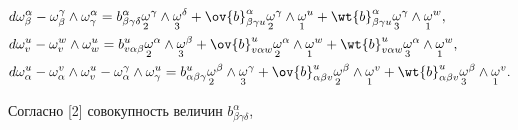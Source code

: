 \begin{align}


&d \omega^{\alpha}_{\beta} - \omega^{\gamma}_{\beta}\wedge


\omega^{\alpha}_{\gamma}=


b^{\alpha}_{\beta \gamma \delta}


{\crazy{\omega}{2}}^{\gamma}\wedge{\crazy{\omega}{3}}^{\delta}+


\ov{b}^{\alpha}_{\beta \gamma u}


{\crazy{\omega}{2}}^{\gamma}\wedge{\crazy{\omega}{1}}^{u}+


\wt{b}^{\alpha}_{\beta \gamma u}


{\crazy{\omega}{3}}^{\gamma}\wedge{\crazy{\omega}{1}}^{w},\notag\\


%


&d {\omega}^{u}_{v} - \omega^{w}_{v}\wedge


\omega^{u}_{w}=


b^{u}_{v \alpha \beta}


{\crazy{\omega}{2}}^{\alpha}\wedge{\crazy{\omega}{3}}^{\beta}+


\ov{b}^{u}_{v \alpha w}


{\crazy{\omega}{2}}^{\alpha}\wedge{\crazy{\omega}{1}}^{w}+


\wt{b}^{u}_{v \alpha w}


{\crazy{\omega}{3}}^{\alpha}\wedge{\crazy{\omega}{1}}^{w},\\


%


&d {\omega}^{u}_{\alpha} - \omega^{v}_{\alpha}\wedge


\omega^{u}_{v}- \omega^{\gamma}_{\alpha}\wedge


\omega^{u}_{\gamma}=


b^{u}_{\alpha \beta \gamma}


{\crazy{\omega}{2}}^{\beta}\wedge{\crazy{\omega}{3}}^{\gamma}+


\ov{b}^{u}_{\alpha \beta v}


{\crazy{\omega}{2}}^{\beta}\wedge{\crazy{\omega}{1}}^{v}+


\wt{b}^{u}_{\alpha \beta v}


{\crazy{\omega}{3}}^{\beta}\wedge{\crazy{\omega}{1}}^{v}.\notag


\end{align}





Согласно [2] совокупность величин $b^{\alpha}_{\beta \gamma \delta}$,



